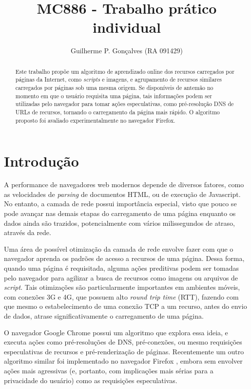\documentclass[10pt,twocolumn,letterpaper]{article}
\begin{document}
\title{MC886 - Trabalho prático individual}
\author{Guilherme P. Gonçalves (RA 091429)}

\maketitle
\begin{abstract}
Este trabalho propõe um algoritmo de aprendizado online dos recursos carregados por páginas da Internet, como \emph{scripts} e imagens, e agrupamento de recursos similares carregados por páginas sob uma mesma origem. Se disponíveis de antemão no momento em que o usuário requisita uma página, tais informações podem ser utilizadas pelo navegador para tomar ações especulativas, como pré-resolução DNS de URLs de recursos, tornando o carregamento da página mais rápido. O algoritmo proposto foi avaliado experimentalmente no navegador Firefox.
\end{abstract}

\section{Introdução}

A performance de navegadores web modernos depende de diversos fatores, como as velocidades de \emph{parsing} de documentos HTML, ou de execução de Javascript. No entanto, a camada de rede possui importância especial, visto que pouco se pode avançar nas demais etapas do carregamento de uma página enquanto os dados ainda são trazidos, potencialmente com vários milissegundos de atraso, através da rede.

Uma área de possível otimização da camada de rede envolve fazer com que o navegador aprenda os padrões de acesso a recursos de uma página. Dessa forma, quando uma página é requisitada, alguma ações preditivas podem ser tomadas pelo navegador para agilizar a busca de recursos como imagens ou arquivos de \emph{script}. Tais otimizações são particularmente importantes em ambientes móveis, com conexões 3G e 4G, que possuem alto \emph{round trip time} (RTT), fazendo com que mesmo o estabelecimento de uma conexão TCP a um recurso, antes do envio de dados, atrase significativamente o carregamento de uma página.

O navegador Google Chrome possui um algoritmo \cite{ChromeLearning:2013:Online} que explora essa ideia, e executa ações como pré-resoluções de DNS, pré-conexões, ou mesmo requisições especulativas de recursos e pré-renderização de páginas. Recentemente um outro algoritmo similar foi implementado no navegador Firefox \cite{BugzillaSeer:2013:Online}, embora sem envolver ações mais agressivas (e, portanto, com implicações mais sérias para a privacidade do usuário) como as requisições especulativas.
\end{document}
